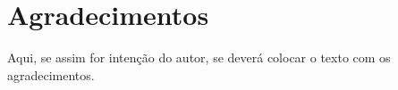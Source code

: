 \chapter*{Agradecimentos}

Aqui, se assim for intenção do autor, se deverá colocar o texto com os agradecimentos.